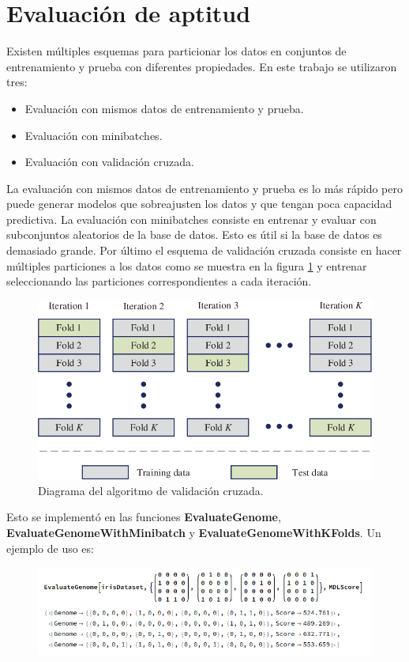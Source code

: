 \documentclass[10pt,a4paper]{article}
\begin{document}
\section{Evaluación de aptitud} \label{sec:apt}
Existen múltiples esquemas para particionar los datos en conjuntos de entrenamiento y prueba con diferentes propiedades. En este trabajo se utilizaron tres:
\begin{itemize}
	\item Evaluación con mismos datos de entrenamiento y prueba.
	\item Evaluación con minibatches.
	\item Evaluación con validación cruzada.
\end{itemize}

La evaluación con mismos datos de entrenamiento y prueba es lo más rápido pero puede generar modelos que sobreajusten los datos y que tengan poca capacidad predictiva. La evaluación con minibatches consiste en entrenar y evaluar con subconjuntos aleatorios de la base de datos. Esto es útil si la base de datos es demasiado grande. Por último el esquema de validación cruzada consiste en hacer múltiples particiones a los datos como se muestra en la figura \ref{fig:crossvalidation} y entrenar seleccionando las particiones correspondientes a cada iteración.

\begin{figure}[h!tb!]
\centering
    \includegraphics[scale=0.35]{img/cross-validation.png}
    \caption{Diagrama del algoritmo de validación cruzada.}
    \label{fig:crossvalidation}
\end{figure}

Esto se implementó en las funciones \textbf{EvaluateGenome}, \textbf{EvaluateGenomeWithMinibatch} y \textbf{EvaluateGenomeWithKFolds}. Un ejemplo de uso es:

\begin{figure}[h!tb!]
\centering
    \includegraphics[scale=0.45]{img/evaluate_iris.png}
\end{figure}
\end{document}
